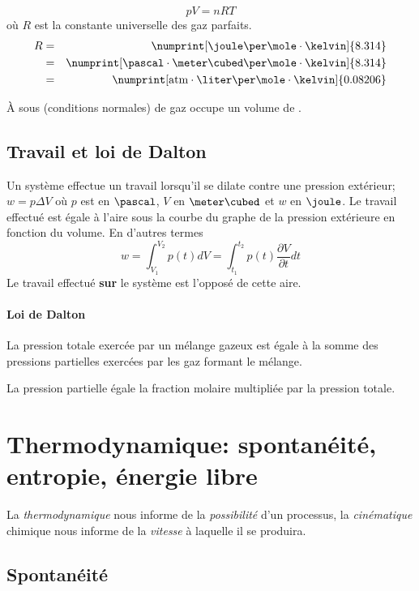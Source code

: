 \[ pV = nRT \]
où $R$ est la constante universelle des gaz parfaits.
\begin{eqnarray*}
	R &=& \numprint[\joule\per\mole\cdot\kelvin]{8.314}\\
	&=& \numprint[\pascal\cdot\meter\cubed\per\mole\cdot\kelvin]{8.314}\\
	&=& \numprint[\atm\cdot\liter\per\mole\cdot\kelvin]{0.08206}
\end{eqnarray*}

\`A  sous  (conditions normales)  de gaz occupe un volume de .

\subsection{Travail et loi de Dalton}

Un système effectue un travail lorsqu'il se dilate contre une pression extérieur; $w=p\Delta V$
où $p$ est en $\pascal$, $V$ en $\meter\cubed$ et $w$ en $\joule$.
Le travail effectué est égale à l'aire sous la courbe du graphe de la pression extérieure en fonction du volume.
En d'autres termes
\[ w = \int_{V_1}^{V_2} p(t) dV = \int_{t_1}^{t_2} p(t) \frac{\partial V}{\partial t} dt \]
Le travail effectué \textbf{sur} le système est l'opposé de cette aire.

\paragraph{Loi de Dalton} La pression totale exercée par un mélange gazeux est égale à la somme des pressions partielles exercées par les gaz formant le mélange.

La pression partielle égale la fraction molaire multipliée par la pression totale.

\section{Thermodynamique: spontanéité, entropie, énergie libre}

La \emph{thermodynamique} nous informe de la \emph{possibilité} d'un processus, la \emph{cinématique} chimique nous informe de la \emph{vitesse} à laquelle il se produira.

\subsection{Spontanéité}

